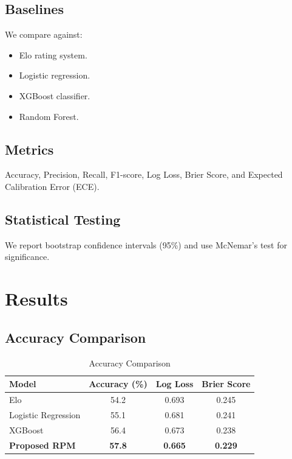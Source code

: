 \documentclass{article}
\begin{document}
\subsection{Baselines}
We compare against:
\begin{itemize}
    \item Elo rating system.
    \item Logistic regression.
    \item XGBoost classifier.
    \item Random Forest.
\end{itemize}

\subsection{Metrics}
Accuracy, Precision, Recall, F1-score, Log Loss, Brier Score, and Expected Calibration Error (ECE).

\subsection{Statistical Testing}
We report bootstrap confidence intervals (95\%) and use McNemar's test for significance.

\section{Results}

\subsection{Accuracy Comparison}
\begin{table}[h]
\centering
\caption{Accuracy Comparison}
\label{tab:accuracy_comparison}
\begin{tabular}{lccc}
\toprule
\textbf{Model} & \textbf{Accuracy (\%)} & \textbf{Log Loss} & \textbf{Brier Score} \\
\midrule
Elo & 54.2 & 0.693 & 0.245 \\
Logistic Regression & 55.1 & 0.681 & 0.241 \\
XGBoost & 56.4 & 0.673 & 0.238 \\
\textbf{Proposed RPM} & \textbf{57.8} & \textbf{0.665} & \textbf{0.229} \\
\bottomrule
\end{tabular}
\end{table}

\end{document}
